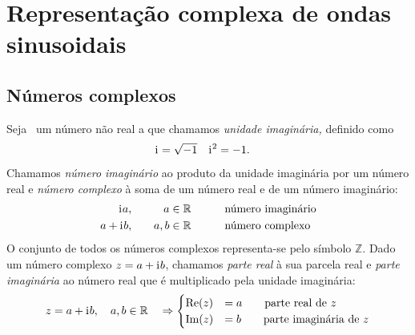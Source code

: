 %

\section{Representação complexa de ondas sinusoidais}
\subsection{Números complexos}
Seja \iu~um número não real a que chamamos \emph{unidade imaginária,} definido
como
\begin{align*}
  \text{i}\mkern1mu&=\sqrt{-1}&\text{i}\mkern1mu^2&=-1.
\end{align*}
Chamamos \emph{número imaginário} ao produto da unidade imaginária por um número
real e \emph{número complexo} à soma de um número real e de um número
imaginário:
\begin{alignat*}{3}
  \text{i}\mkern1mu a,  &&\quad   a\in\mathbb{R} & \qquad &&\text{número imaginário}\\
  a+\text{i}\mkern1mu b,&&\quad a,b\in\mathbb{R} & \qquad &&\text{número complexo}
\end{alignat*}
O conjunto de todos os números complexos representa-se pelo símbolo
$\mathbb{Z}$. Dado um número complexo ${z}=a+\text{i}\mkern1mu b$, chamamos \emph{parte
real} à sua parcela real e \emph{parte imaginária} ao número real que é
multiplicado pela unidade imaginária:
\begin{equation*}
  {z}=a+\text{i}\mkern1mu b,\quad a,b\in\mathbb{R} \quad \Rightarrow
  \begin{cases}
    \text{Re}( z) &= a\qquad\text{parte real de } z\\
    \text{Im}( z) &= b\qquad\text{parte imaginária de } z
  \end{cases}
\end{equation*}


